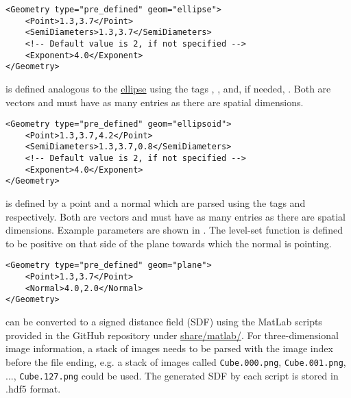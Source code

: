 \begin{minipage}{\linewidth}
\vspace{0.5cm}
\begin{lstlisting}[caption={Example parameters for defining a (super-) ellipse.},captionpos=b, label={lst:ellipse}]
<Geometry type="pre_defined" geom="ellipse"> 
    <Point>1.3,3.7</Point>
    <SemiDiameters>1.3,3.7</SemiDiameters>
    <!-- Default value is 2, if not specified --> 
    <Exponent>4.0</Exponent>
</Geometry>
\end{lstlisting}
\end{minipage}

 is defined analogous to the \hyperlink{ellipse}{ellipse} using the tags , , and, if needed, . Both are vectors and must have as many entries as there are spatial dimensions.

\begin{minipage}{\linewidth}
\vspace{0.5cm}
\begin{lstlisting}[caption={Example parameters for defining a (super-) ellipsoid.},captionpos=b, label={lst:ellipsoid}]
<Geometry type="pre_defined" geom="ellipsoid"> 
    <Point>1.3,3.7,4.2</Point>
    <SemiDiameters>1.3,3.7,0.8</SemiDiameters>
    <!-- Default value is 2, if not specified --> 
    <Exponent>4.0</Exponent>
</Geometry>
\end{lstlisting}
\end{minipage}

 is defined by a point and a normal which are parsed using the tags  and  respectively. Both are vectors and must have as many entries as there are spatial dimensions. Example parameters are shown in . The level-set function is defined to be positive on that side of the plane towards which the normal is pointing.

\begin{minipage}{\linewidth}
\vspace{0.5cm}
\begin{lstlisting}[caption={Example parameters for defining a plane.},captionpos=b, label={lst:plane}]
<Geometry type="pre_defined" geom="plane"> 
    <Point>1.3,3.7</Point>
    <Normal>4.0,2.0</Normal>
</Geometry>
\end{lstlisting}
\end{minipage}

 can be converted to a signed distance field (SDF) using the MatLab scripts provided in the GitHub repository under \href{https://github.com/kkmaute/moris/tree/main/share/matlab}{share/matlab/}. For three-dimensional image information, a stack of images needs to be parsed with the image index before the file ending, e.g. a stack of images called \texttt{Cube.000.png}, \texttt{Cube.001.png}, ..., \texttt{Cube.127.png} could be used.
The generated SDF by each script is stored in .hdf5 format. 

